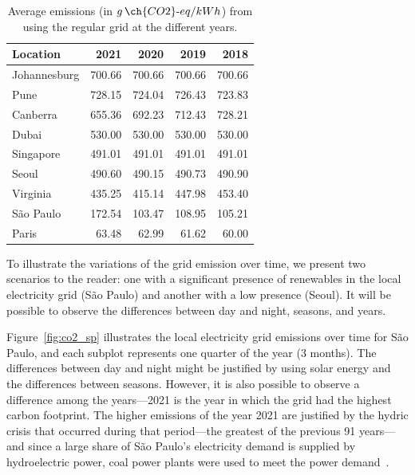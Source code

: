 \begin{table}[h]
  \caption{Average emissions (in $g\,\ch{CO2}\text{-}eq/kWh$) from using the regular grid at the different years.}\label{tab:grid_emissions_avg_year} \centering
  \begin{tabular}{|l|r|r|r|r|}    
  \hline   
  \textbf{Location} &  \textbf{2021} & \textbf{2020} & \textbf{2019} & \textbf{2018}\\
  \hline
  Johannesburg & 700.66 & 700.66 & 700.66 & 700.66  \\
  \hline
  Pune & 728.15 & 724.04 & 726.43 & 723.83     \\
  \hline
  Canberra & 655.36 & 692.23 & 712.43 & 728.21\\
  \hline
  Dubai & 530.00  & 530.00 & 530.00 & 530.00     \\
  \hline
  Singapore & 491.01 & 491.01 & 491.01 & 491.01 \\
  \hline     
  Seoul & 490.60 & 490.15 & 490.73 & 490.90     \\
  \hline
  Virginia  & 435.25 & 415.14 & 447.98 & 453.40 \\
  \hline
  São Paulo &  172.54 &  103.47 & 108.95 &  105.21 \\
  \hline 
  Paris &  63.48  & 62.99 & 61.62   & 60.00   \\
  \hline

\end{tabular}  
\end{table}


To illustrate the variations of the grid emission over time, we present two scenarios to the reader: one with a significant presence of renewables in the local electricity grid (São Paulo) and another with a low presence (Seoul). It will be possible to observe the differences between day and night, seasons, and years.


Figure~\ref{fig:co2_sp} illustrates the local electricity grid emissions over time for São Paulo, and each subplot represents one quarter of the year (3 months). The differences between day and night might be justified by using solar energy and the differences between seasons. However, it is also possible to observe a difference among the years---2021 is the year in which the grid had the highest carbon footprint. The higher emissions of the year 2021 are justified by the hydric crisis that occurred during that period---the greatest of the previous 91 years---and since a large share of São Paulo's electricity demand is supplied by hydroelectric power, coal power plants were used to meet the power demand~\cite{CNN2021_crisehidrica}.

